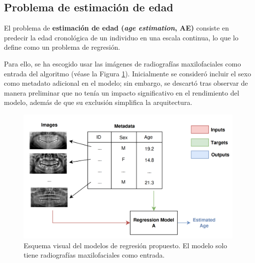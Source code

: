
\subsection{Problema de estimación de edad}

El problema de \textbf{estimación de edad (\textit{age estimation}, AE)} consiste en predecir la edad 
cronológica de un individuo en una escala continua, lo que lo define como un problema de regresión.

Para ello, se ha escogido usar las imágenes de radiografías maxilofaciales como entrada del algoritmo (véase 
la Figura \ref{fig:regression_problems}).
Inicialmente se consideró incluir el sexo como metadato adicional en el modelo; sin embargo, se descartó 
tras observar de manera preliminar que no tenía un impacto significativo en el rendimiento del modelo, 
además de que su exclusión simplifica la arquitectura.

\begin{figure}[h]
    \centering
    \includegraphics[width=\textwidth]{capitulos/cap_04/imagenes/regression_problem.png}
    \caption[
        Esquema visual del modelos de regresión propuesto. 
    ]{
        Esquema visual del modelos de regresión propuesto. 
        El modelo solo tiene radiografías maxilofaciales como entrada. 
    } 
    \label{fig:regression_problems}
\end{figure}



